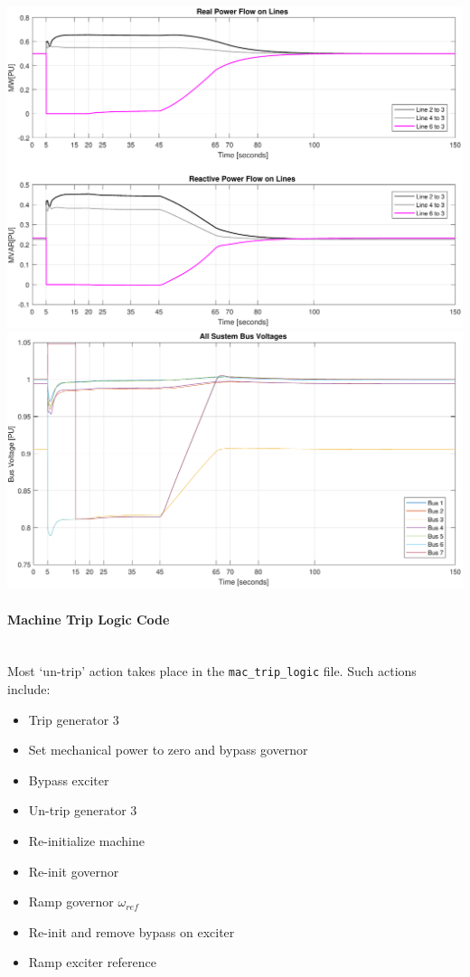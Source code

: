 \documentclass[12pt]{article}
\begin{document}
\pagebreak
\includegraphics[width=\linewidth]{combinedLoadFlow}
\includegraphics[width=\linewidth]{combinedBusV}


\pagebreak
\paragraph{Machine Trip Logic Code} \ \\
Most `un-trip' action takes place in the \verb|mac_trip_logic| file.
Such actions include:
\begin{itemize}
\item Trip generator 3
\item Set mechanical power to zero and bypass governor
\item Bypass exciter
\item Un-trip generator 3
\item Re-initialize machine
\item Re-init governor
\item Ramp governor $\omega_{ref}$
\item Re-init and remove bypass on exciter
\item Ramp exciter reference
\end{itemize} 
\end{document}
